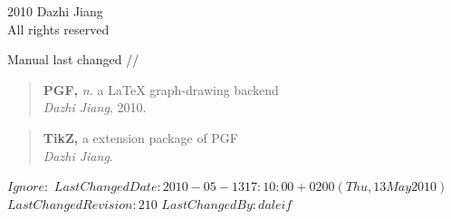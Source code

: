 \begingroup
\footnotesize
\setlength{\parindent}{0pt}
\setlength{\parskip}{\baselineskip}
\textcopyright{} 2010 Dazhi Jiang \\
All rights reserved


\ifMASTER
Manual last changed \svnyear/\svnmonth/\svnday
\fi

\endgroup

\clearpage
\vspace*{\fill}
\begin{quote}
\textbf{PGF,} \textit{n.} a LaTeX graph-drawing backend \\[0.5\baselineskip]
  \hspace*{\fill} 
      \textit{Dazhi Jiang}, 2010.
\end{quote}

\vspace{2\baselineskip}

\begin{quote}
\textbf{TikZ,} a extension package of PGF \\[0.5\baselineskip]
  \hspace*{\fill} \textit{Dazhi Jiang}.
\end{quote}

\vspace{2\baselineskip}

\vspace*{\fill}

\cleardoublepage

\pagestyle{headings}

\setupparasubsecs
\setupmaintoc
\tableofcontents
\setlength{\unitlength}{1pt}
\clearpage
\listoffigures
\clearpage
\listoftables




\svnidlong
{$Ignore: $}
{$LastChangedDate: 2010-05-13 17:10:00 +0200 (Thu, 13 May 2010) $}
{$LastChangedRevision: 210 $}
{$LastChangedBy: daleif $}

